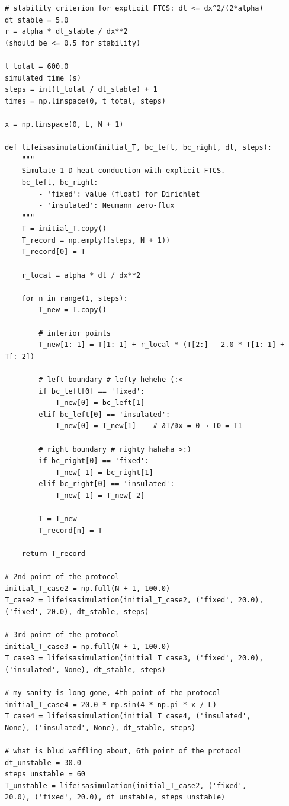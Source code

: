 \documentclass[12pt]{article}
\begin{document}
\begin{enumerate}
\begin{verbatim}
# stability criterion for explicit FTCS: dt <= dx^2/(2*alpha)
dt_stable = 5.0
r = alpha * dt_stable / dx**2
(should be <= 0.5 for stability)

t_total = 600.0
simulated time (s)
steps = int(t_total / dt_stable) + 1
times = np.linspace(0, t_total, steps)

x = np.linspace(0, L, N + 1)

def lifeisasimulation(initial_T, bc_left, bc_right, dt, steps):
    """
    Simulate 1‑D heat conduction with explicit FTCS.
    bc_left, bc_right:
        - 'fixed': value (float) for Dirichlet
        - 'insulated': Neumann zero‑flux
    """
    T = initial_T.copy()
    T_record = np.empty((steps, N + 1))
    T_record[0] = T
    
    r_local = alpha * dt / dx**2
    
    for n in range(1, steps):
        T_new = T.copy()
        
        # interior points
        T_new[1:-1] = T[1:-1] + r_local * (T[2:] - 2.0 * T[1:-1] + T[:-2])
        
        # left boundary # lefty hehehe (:<
        if bc_left[0] == 'fixed':
            T_new[0] = bc_left[1]
        elif bc_left[0] == 'insulated':
            T_new[0] = T_new[1]    # ∂T/∂x = 0 → T0 = T1
        
        # right boundary # righty hahaha >:)
        if bc_right[0] == 'fixed':
            T_new[-1] = bc_right[1]
        elif bc_right[0] == 'insulated':
            T_new[-1] = T_new[-2]
        
        T = T_new
        T_record[n] = T
    
    return T_record

# 2nd point of the protocol
initial_T_case2 = np.full(N + 1, 100.0)
T_case2 = lifeisasimulation(initial_T_case2, ('fixed', 20.0),
('fixed', 20.0), dt_stable, steps)

# 3rd point of the protocol
initial_T_case3 = np.full(N + 1, 100.0)
T_case3 = lifeisasimulation(initial_T_case3, ('fixed', 20.0), 
('insulated', None), dt_stable, steps)

# my sanity is long gone, 4th point of the protocol
initial_T_case4 = 20.0 * np.sin(4 * np.pi * x / L)
T_case4 = lifeisasimulation(initial_T_case4, ('insulated', 
None), ('insulated', None), dt_stable, steps)

# what is blud waffling about, 6th point of the protocol
dt_unstable = 30.0
steps_unstable = 60
T_unstable = lifeisasimulation(initial_T_case2, ('fixed', 
20.0), ('fixed', 20.0), dt_unstable, steps_unstable)
  \end{verbatim}
\end{enumerate}
\end{document}
